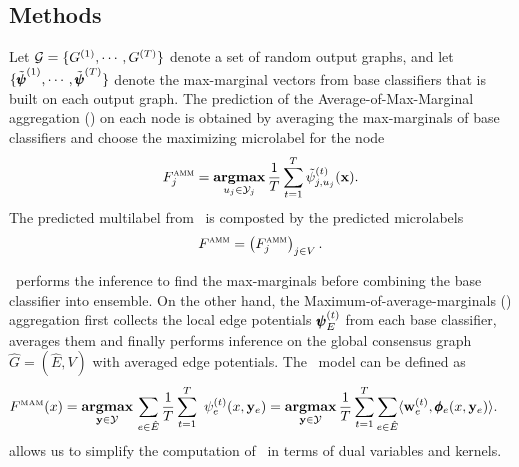 {\subsection{Methods}

Let $\mathcal{G}=\{G^{(1)},\cdots,G^{(T)}\}$ denote a set of random output graphs, and let $\{\tilde{\pmb \psi}^{(1)},\cdots,\tilde{\pmb \psi}^{(T)}\}$ denote the max-marginal vectors from base classifiers that is built on each output graph.
The prediction of the Average-of-Max-Marginal aggregation (\amm) on each node is obtained by averaging the max-marginals of base classifiers and choose the maximizing microlabel for the node
\begin{align*}
	F_j^{\text{{\sc amm}}}=\underset{u_j\in\mathcal{Y}_j}{\textbf{argmax}}\,\frac{1}{T}\sum_{t=1}^{T}\tilde{\psi}_{j,u_j}^{(t)}(\mathbf {x}).	\end{align*}
The predicted multilabel from \amm\ is composted by the predicted microlabels
\begin{align*}
	F^{\text{{\sc amm}}}=\left(F_j^{\text{{\sc amm}}}\right)_{j\in V}.
\end{align*}

\amm\ performs the inference to find the max-marginals before combining the base classifier into ensemble. 
On the other hand, the Maximum-of-average-marginals (\mam) aggregation first collects the local edge potentials $\pmb \psi_E^{(t)}$ from each base classifier, averages them and finally performs inference on the global consensus graph $\hat{G}=(\hat{E},V)$ with averaged edge potentials.
The \mam\ model can be defined as
\begin{align*}
	F^{\text{\tiny MAM}}(x) &= \underset{\vy \in \Ycal }{\argmax}\,\sum_{e\in \hat{E}}\frac{1}{T}\sum_{t=1}^{T}\ \psi^{(t)}_e(x,\vy_e)
	= \underset{\vy \in \Ycal}{\argmax}\, \frac{1}{T} \sum_{t=1}^T \sum_{e\in \hat{E}} \ip{\vw_e^{(t)}}{\phib_e(x,\vy_e)}. %
\end{align*}
 allows us to simplify the computation of \mam\ in terms of dual variables and kernels.
\iffalse
As a results, the \mam\ ensemble can be equivalently stated as
\begin{align*}
F^{\text{\tiny MAM}}(x) 
 & =\underset{\vy \in \Ycal}{\argmax}\, \frac{1}{T} \sum_{t=1}^T \sum_{i,e,\vu_e} \mu^{(t)}(i,e,\vu_e) \cdot H_e(i,\vu_e;x,\vy_e)\nonumber \\
 & =\underset{\vy \in \Ycal}{\argmax}\,   \sum_{i,e,\vu_e}  \bar\mu(i,e,\vu_e) H_e(i,\vu_e;x,\vy_e),
\end{align*}
where by $\bar\mu(i,e,\vu_e)=\frac{1}{T}\sum_{t=1}^T\mu^{(t)}(i,e,\vu_e)$ we denote the marginalized dual variable averaged over ensemble, and
\begin{align*}
	H_e(x_i,\vu_e;x,\vy_e)  = K_{\phib}(x,x_i)\cdot\left(K_{\Upsilon,e}(\vy_{ie},\vy_e)-K_{\Upsilon,e}(\vu_e,\vy_e)\right).
\end{align*}
\fi

}
